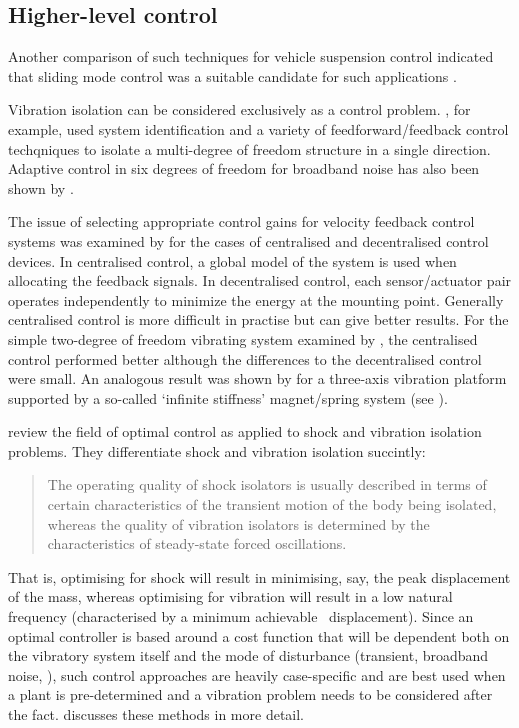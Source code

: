 \subsection{Higher-level control}

Another comparison of such techniques for vehicle suspension control indicated that sliding mode control was a suitable candidate for such applications \cite{dong2009}.

\cite{zuo2004}

Vibration isolation can be considered exclusively as a control problem. 
\textcite{guo2005}, for example, used system identification and a variety of feedforward/feedback control techqniques to isolate a multi-degree of freedom structure in a single direction.
Adaptive control in six degrees of freedom for broadband noise has also been shown by \textcite{duindam2005}.

The issue of selecting appropriate control gains for velocity feedback control systems was examined by \textcite{engels2008} for the cases of centralised and decentralised control devices.
In centralised control, a global model of the system is used when allocating the feedback signals.
In decentralised control, each sensor/actuator pair operates independently to minimize the energy at the mounting point.
Generally centralised control is more difficult in practise but can give better results.
For the simple two-degree of freedom vibrating system examined by \textcite{engels2008}, the centralised control performed better although the differences to the decentralised control were small.
An analogous result was shown by \textcite{hoque2006} for a three-axis vibration platform supported by a so-called `infinite stiffness' magnet/spring system (see ).


\textcite{balandin1998} review the field of optimal control as applied to shock and vibration isolation problems.
They differentiate shock and vibration isolation succintly:
\begin{quote}
The operating quality of shock isolators is usually described in terms of certain characteristics of the transient motion of the body being isolated, whereas the quality of vibration isolators is determined by the characteristics of steady-state forced oscillations.
\end{quote}
That is, optimising for shock will result in minimising, say, the peak displacement of the mass, whereas optimising for vibration will result in a low natural frequency (characterised by a minimum achievable \RMS\ displacement).
Since an optimal controller is based around a cost function that will be dependent both on the vibratory system itself and the mode of disturbance (transient, broadband noise, \etc), such control approaches are heavily case-specific and are best used when a plant is pre-determined and a vibration problem needs to be considered after the fact.
\textcite{bolotnik2001} discusses these methods in more detail.

